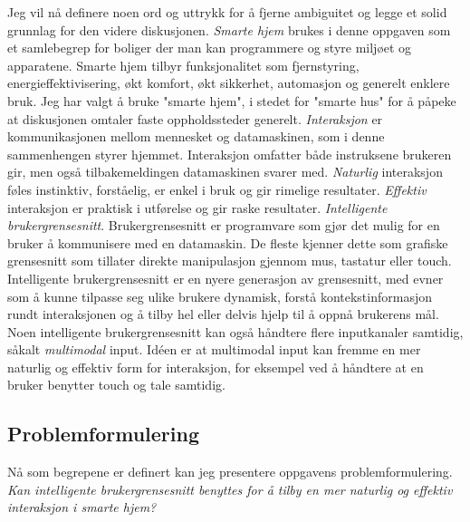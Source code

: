 Jeg vil nå definere noen ord og uttrykk for å fjerne ambiguitet og legge et solid grunnlag for den videre diskusjonen.
\newline\newline
\emph{Smarte hjem} brukes i denne oppgaven som et samlebegrep for boliger der man kan programmere og styre miljøet og apparatene. Smarte hjem tilbyr funksjonalitet som fjernstyring, energieffektivisering, økt komfort, økt sikkerhet, automasjon og generelt enklere bruk. Jeg har valgt å bruke "smarte hjem", i stedet for "smarte hus" for å påpeke at diskusjonen omtaler faste oppholdssteder generelt.
\newline\newline
\emph{Interaksjon} er kommunikasjonen mellom mennesket og datamaskinen, som i denne sammenhengen styrer hjemmet. Interaksjon omfatter både instruksene brukeren gir, men også tilbakemeldingen datamaskinen svarer med.
\newline\newline
\emph{Naturlig} interaksjon føles instinktiv, forståelig, er enkel i bruk og gir rimelige resultater.
\newline\newline
\emph{Effektiv} interaksjon er praktisk i utførelse og gir raske resultater.
\newline\newline
\emph{Intelligente brukergrensesnitt}. Brukergrensesnitt er programvare som gjør det mulig for en bruker å kommunisere med en datamaskin. De fleste kjenner dette som grafiske grensesnitt som tillater direkte manipulasjon gjennom mus, tastatur eller touch. Intelligente brukergrensesnitt er en nyere generasjon av grensesnitt, med evner som å kunne tilpasse seg ulike brukere dynamisk, forstå kontekstinformasjon rundt interaksjonen og å tilby hel eller delvis hjelp til å oppnå brukerens mål. Noen intelligente brukergrensesnitt kan også håndtere flere inputkanaler samtidig, såkalt \emph{multimodal} input. Idéen er at multimodal input kan fremme en mer naturlig og effektiv form for interaksjon, for eksempel ved å håndtere at en bruker benytter touch og tale samtidig.

\subsection*{Problemformulering}
Nå som begrepene er definert kan jeg presentere oppgavens problemformulering.
\newline\newline
\emph{Kan intelligente brukergrensesnitt benyttes for å tilby en mer naturlig og effektiv interaksjon i smarte hjem?}

